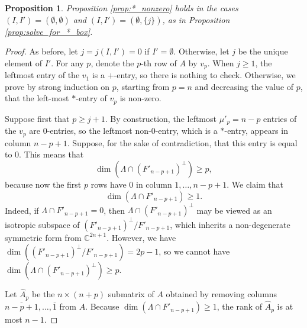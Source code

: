 \documentclass[12pt]{amsart}
\newtheorem{proposition}[definition]{Proposition}
\newcommand{\bC}{\mathbb{C}}
\begin{document}
\begin{proposition}\label{prop:*_nonzero_box}
Proposition \ref{prop:*_nonzero} holds in the cases $(I,I')=(\emptyset,\emptyset)$ and $(I,I')=(\emptyset,\{j\})$, as in Proposition \ref{prop:solve_for_*_box}.
\end{proposition}

\begin{proof}
As before, let $j = j(I,I') = 0$ if $I' = \emptyset$. Otherwise, let $j$ be the unique element of $I'$. For any $p$, denote the $p$-th row of $A$ by $v_p$. When $j \ge 1$, the leftmost entry of the $v_1$ is a $+$-entry, so there is nothing to check. Otherwise, we prove by strong induction on $p$, starting from $p=n$ and decreasing the value of $p$, that the left-most $*$-entry of $v_p$ is non-zero.

Suppose first that $p\ge j+1$. By construction, the leftmost $\mu'_p=n-p$ entries of the $v_p$ are $0$-entries, so the leftmost non-$0$-entry, which is a $*$-entry, appears in column $n-p+1$. Suppose, for the sake of contradiction, that this entry is equal to $0$. This means that
    \begin{equation*}
        \dim(\Lambda \cap (F'_{n-p+1})^\perp) \ge p,
    \end{equation*}
    because now the first $p$ rows have $0$ in column $1, \ldots, n-p+1$. We claim that
    \begin{equation*}
        \dim(\Lambda \cap F'_{n-p+1}) \ge 1.
    \end{equation*}
Indeed, if $\Lambda \cap F'_{n-p+1}=0$, then $\Lambda \cap (F'_{n-p+1})^\perp$ may be viewed as an isotropic subspace of $(F'_{n-p+1})^\perp/F'_{n-p+1}$, which inherits a non-degenerate symmetric form from $\bC^{2n+1}$. However, we have $\dim((F'_{n-p+1})^\perp/F'_{n-p+1})=2p-1$, so we cannot have $\dim(\Lambda \cap (F'_{n-p+1})^\perp) \ge p$.

Let $\widehat{A}_p$ be the $n \times (n+p)$ submatrix of $A$ obtained by removing columns $\overline{n-p+1}, \ldots, \overline{1}$ from $A$. Because $\dim(\Lambda \cap F'_{n-p+1}) \ge 1$, the rank of $\widehat{A}_p$ is at most $n-1$. 


\end{proof}
\end{document}
